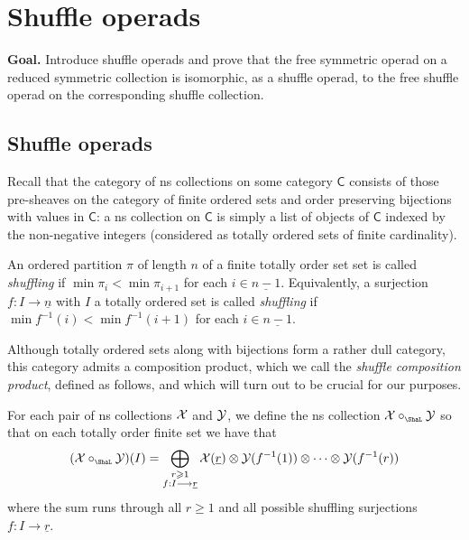\section{Shuffle operads}\label{lecture:shuffleops}

\textbf{Goal.} Introduce shuffle operads
and prove that the free symmetric operad
on a reduced symmetric collection is
isomorphic, as a shuffle operad,
to the free shuffle operad on the
corresponding shuffle collection. 

\subsection{Shuffle operads}

Recall that the category of ns collections
on some category $\mathsf{C}$ 
consists of those pre-sheaves on
the category of finite ordered sets
and order preserving bijections with
values in $\mathsf{C}$: a ns collection
on $\mathsf{C}$ is simply a list of
objects of $\mathsf{C}$ indexed by
the non-negative integers (considered
as totally ordered sets of finite 
cardinality). 

\begin{definition}
An ordered partition $\pi$ of length $n$
of a finite totally order set
set is called \emph{shuffling} if
$\min \pi_i < \min \pi_{i+1}$ for
each $i\in \underline{n-1}$. Equivalently, 
a surjection $f:I\longrightarrow \underline{n}$
with $I$ a totally ordered set
is called \emph{shuffling} if
$\min f^{-1}(i) < \min f^{-1}(i+1)$
for each $i\in \underline{n-1}$.
\end{definition}

Although totally ordered
sets along with bijections form a rather
dull category, this category
admits a composition product, which we call
the \emph{shuffle composition product},
defined as follows, and which will turn
out to be crucial for our purposes.

\begin{definition}
For each pair of ns collections $\mathcal{X}$
and $\mathcal{Y}$, we define the ns collection
$\XX\circ_{\Sha} \YY$ so that on each
totally order finite set we have that 
\[
(\XX\circ_{\Sha} \YY)(I)
	=
	 \bigoplus_{\substack{r\geqslant 1
	 	\\ f: I \longrightarrow \underline{r}}}
	 \XX(\underline{r})\otimes 
	 \YY(f^{-1}(1))
	 	\otimes
	 		\cdots
	 			\otimes
	 				\YY(f^{-1}(r))
\]
where the sum runs through all $r\geqslant 1$
and all possible 
shuffling surjections 
$f : I \longrightarrow \underline{r}$.
\end{definition}

